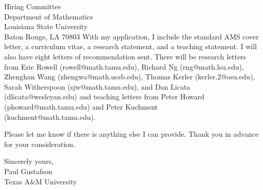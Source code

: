 \documentclass[11pt]{letter} %
\begin{document}
\begin{letter}{Hiring Committee \\
Department of Mathematics \\
Louisiana State University \\
Baton Rouge, LA 70803}
With my application, I include the standard AMS cover letter, a curriculum
vitae, a research statement, and a teaching statement. I will also have eight
letters of recommendation sent. There will be research letters from
Eric Rowell (rowell@math.tamu.edu),  Richard Ng (rng@math.lsu.edu), Zhenghan Wang (zhengwa@math.ucsb.edu), Thomas Kerler (kerler.2@osu.edu), Sarah Witherspoon (sjw@math.tamu.edu), and Dan Licata (dlicata@wesleyan.edu) and teaching letters from Peter Howard (phoward@math.tamu.edu) and  Peter Kuchment \\ (kuchment@math.tamu.edu).

Please let me know if there is anything else I can provide. Thank you in
advance for your consideration.

\closing{Sincerely yours,\\ Paul Gustafson \\ Texas A\&M University}




\end{letter}
\end{document}
